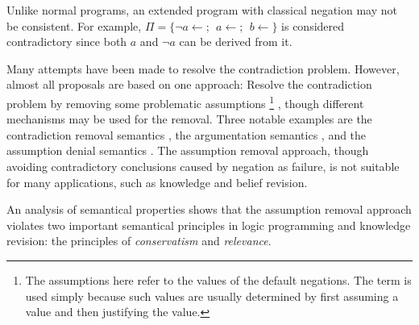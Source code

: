 Unlike normal programs, an extended program with classical negation may
not be consistent.
For example, 
$\Pi = \{ \neg a \leftarrow ; \ \
a \leftarrow ; \ \ b \leftarrow\}$ is considered contradictory
since both $a$ and $\neg a$ can be derived from it. 

Many attempts have been made to resolve the contradiction problem.
However, almost all proposals are based on one approach:
Resolve the contradiction problem by removing some problematic 
assumptions 
\footnote{The assumptions here refer to the values of 
the default negations. The term is used simply because 
such values are usually determined by first assuming a value and
then justifying the value.}
, though different mechanisms may be used for the
removal.
Three notable examples are the contradiction removal semantics
\cite{paa91a}, the argumentation semantics \cite{dung93a}, and
the assumption denial semantics \cite{youyuan94}.
The  assumption removal approach, though avoiding contradictory 
conclusions caused by negation as failure, is not suitable for many 
applications, such as knowledge and belief revision.

An analysis of semantical properties shows that 
the assumption removal approach 
violates two important semantical principles in logic 
programming and knowledge revision: 
the principles of {\em conservatism} and {\em relevance}.

